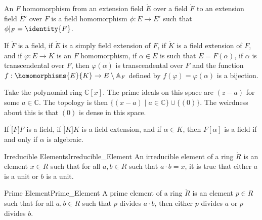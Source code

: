 \documentclass{article}                                                        %
\begin{document}
        \begin{definition}
            An $F$ homomorphism from an extension field $\ring{E}$ over a field
            $\ring{F}$ to an extension field $\ring{E'}$  over $F$ is a field
            homomorphism $\phi:E\rightarrow{E}'$ such that
            $\phi|_{F}=\identity{F}$.
        \end{definition}
        \begin{theorem}
            If $\ring{F}$ is a field, if $\ring{E}$ is a simply field extension
            of $F$, if $\ring{K}$ is a field extension of $F$, and if
            $\varphi:E\rightarrow{K}$ is an $F$ homomorphism, if $\alpha\in{E}$
            is such that $E=F(\alpha)$, if $\alpha$ is transcendental over $F$,
            then $\varphi(\alpha)$ is transcendental over $F$ and the function
            $f:\homomorphisms{E}{K}\rightarrow{E}\setminus\mathbb{A}_{F}$
            defined by $f(\varphi)=\varphi(\alpha)$ is a bijection.
        \end{theorem}
        \begin{example}
            Take the polynomial ring $\mathbb{C}[x]$. The prime ideals on this
            space are $(z-a)$ for some $a\in\mathbb{C}$. The topology is then
            $\{(x-a)\;|\;a\in\mathbb{C}\}\cup\{(0)\}$. The weirdness about this
            is that $(0)$ is dense in this space.
        \end{example}
        \begin{theorem}
            If $\ring[F]{F}$ is a field, if $\ring[K]{K}$ is a field extension,
            and if $\alpha\in{K}$, then $F[\alpha]$ is a field if and only if
            $\alpha$ is algebraic. 
        \end{theorem}
        \begin{theorem}
        \end{theorem}
        \begin{fdefinition}{Irreducible Elements}{Irreducible_Element}
            An irreducible element of a ring $\ring{R}$ is an element
            $x\in{R}$ such that for all $a,b\in{R}$ such that $a\cdot{b}=x$, it
            is true that either $a$ is a unit or $b$ is a unit.
        \end{fdefinition}
        \begin{fdefinition}{Prime Element}{Prime_Element}
            A prime element of a ring $\ring{R}$ is an element $p\in{R}$
            such that for all $a,b\in{R}$ such that $p$ divides $a\cdot{b}$,
            then either $p$ divides $a$ or $p$ divides $b$.
        \end{fdefinition}
\end{document}
